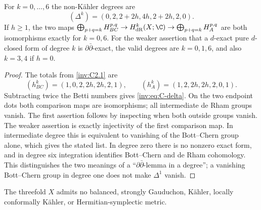 \begin{proposition}\label{inv:C3.4}
For $k=0,\ldots,6$ the non-K\"ahler degrees are
\begin{equation}\label{inv:eq:C-delta}
(\Delta^k)=(0,2,2+2h,4h,2+2h,2,0).
\end{equation}
If $h\ge1$, the two maps
$\bigoplus_{p+q=k}H^{p,q}_{BC}\to H^k_{\mathrm{dR}}(X;\C)
\to\bigoplus_{p+q=k}H^{p,q}_A$
are both isomorphisms exactly for $k=0,6$.
For the weaker assertion that a $d$-exact pure $d$-closed form of
degree $k$ is $\partial\bar\partial$-exact, the valid degrees are
$k=0,1,6$, and also $k=3,4$ if $h=0$.
\end{proposition}

\begin{proof}
The totals from \ref{inv:C2.1} are
\[
(h^k_{BC})=(1,0,2,2h,2h,2,1),\qquad
(h^k_A)=(1,2,2h,2h,2,0,1).
\]
Subtracting twice the Betti numbers gives \eqref{inv:eq:C-delta}.
On the two endpoint dots both comparison maps are isomorphisms;
all intermediate de Rham groups vanish.  The first assertion follows
by inspecting when both outside groups vanish.  The weaker assertion
is exactly injectivity of the first comparison map.  In intermediate
degree this is equivalent to vanishing of the Bott--Chern group alone,
which gives the stated list.  In degree zero there is no nonzero
exact form, and in degree six integration identifies Bott--Chern and
de Rham cohomology.  This distinguishes the two meanings of a
``$\partial\bar\partial$-lemma in a degree''; a vanishing Bott--Chern
group in degree one does not make $\Delta^1$ vanish.
\end{proof}

\begin{proposition}\label{inv:C3.5}
The threefold $X$ admits no balanced, strongly Gauduchon, K\"ahler,
locally conformally K\"ahler, or Hermitian-symplectic metric.
\end{proposition}

